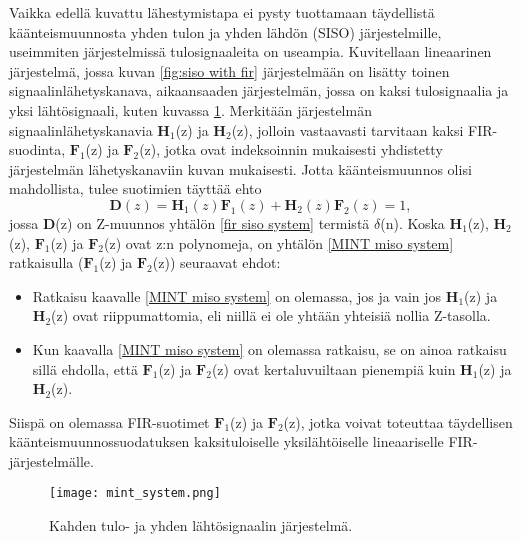 \documentclass[finnish,12pt]{article}
\begin{document}
Vaikka edellä kuvattu lähestymistapa ei pysty tuottamaan täydellistä käänteismuunnosta yhden tulon ja yhden lähdön (SISO) järjestelmille, useimmiten järjestelmissä tulosignaaleita on useampia. Kuvitellaan lineaarinen järjestelmä, jossa kuvan \ref{fig:siso with fir} järjestelmään on lisätty toinen signaalinlähetyskanava, aikaansaaden järjestelmän, jossa on kaksi tulosignaalia ja yksi lähtösignaali, kuten kuvassa \ref{fig:MINT MISO system}. Merkitään järjestelmän signaalinlähetyskanavia $\textbf{H}_1$(z) ja $\textbf{H}_2$(z), jolloin vastaavasti tarvitaan kaksi FIR-suodinta, $\textbf{F}_1$(z) ja $\textbf{F}_2$(z), jotka ovat indeksoinnin mukaisesti yhdistetty järjestelmän lähetyskanaviin kuvan mukaisesti. Jotta käänteismuunnos olisi mahdollista, tulee suotimien täyttää ehto \begin{equation}
\label{MINT miso system}
\textbf{D}(z) = \textbf{H}_1(z) \textbf{F}_1(z) + \textbf{H}_2(z) \textbf{F}_2(z) = 1,
\end{equation} jossa \textbf{D}(z) on Z-muunnos yhtälön \eqref{fir siso system} termistä $\delta$(n). Koska $\textbf{H}_1$(z), $\textbf{H}_2$(z), $\textbf{F}_1$(z) ja $\textbf{F}_2$(z) ovat z:n polynomeja, on yhtälön \eqref{MINT miso system} ratkaisulla ($\textbf{F}_1$(z) ja $\textbf{F}_2$(z)) seuraavat ehdot:
\begin{itemize}
\item Ratkaisu kaavalle \eqref{MINT miso system} on olemassa, jos ja vain jos $\textbf{H}_1$(z) ja $\textbf{H}_2$(z) ovat riippumattomia, eli niillä ei ole yhtään yhteisiä nollia Z-tasolla.
\item Kun kaavalla \eqref{MINT miso system} on olemassa ratkaisu, se on ainoa ratkaisu sillä ehdolla, että $\textbf{F}_1$(z) ja $\textbf{F}_2$(z) ovat kertaluvuiltaan pienempiä kuin $\textbf{H}_1$(z) ja $\textbf{H}_2$(z).
\end{itemize} Siispä on olemassa FIR-suotimet $\textbf{F}_1$(z) ja $\textbf{F}_2$(z), jotka voivat toteuttaa täydellisen käänteismuunnossuodatuksen kaksituloiselle yksilähtöiselle  lineaariselle FIR-järjestelmälle. \cite{MMiyoshi1988}

\begin{figure}[h!]
	\centering
	\texttt{[image: mint\_system.png]}
	\caption{Kahden tulo- ja yhden lähtösignaalin järjestelmä. \cite{MMiyoshi1988}}
	\label{fig:MINT MISO system}
\end{figure}
\end{document}
